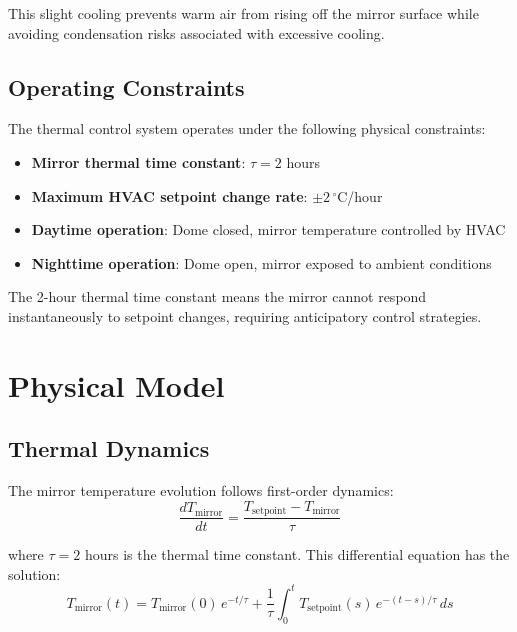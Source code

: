 \documentclass[11pt,letterpaper]{article}
\begin{document}
This slight cooling prevents warm air from rising off the mirror surface while avoiding condensation risks associated with excessive cooling.

\subsection{Operating Constraints}

The thermal control system operates under the following physical constraints:

\begin{itemize}[noitemsep]
    \item \textbf{Mirror thermal time constant}: $\tau = 2$ hours
    \item \textbf{Maximum HVAC setpoint change rate}: $\pm 2\,^\circ$C/hour
    \item \textbf{Daytime operation}: Dome closed, mirror temperature controlled by HVAC
    \item \textbf{Nighttime operation}: Dome open, mirror exposed to ambient conditions
\end{itemize}

The 2-hour thermal time constant means the mirror cannot respond instantaneously to setpoint changes, requiring anticipatory control strategies.

\section{Physical Model}

\subsection{Thermal Dynamics}

The mirror temperature evolution follows first-order dynamics:
\begin{equation}
\frac{dT_{\text{mirror}}}{dt} = \frac{T_{\text{setpoint}} - T_{\text{mirror}}}{\tau}
\label{eq:dynamics}
\end{equation}

where $\tau = 2$ hours is the thermal time constant. This differential equation has the solution:
\begin{equation}
T_{\text{mirror}}(t) = T_{\text{mirror}}(0)\,e^{-t/\tau} + \frac{1}{\tau}\int_0^t T_{\text{setpoint}}(s)\,e^{-(t-s)/\tau}\,ds
\end{equation}
\end{document}
